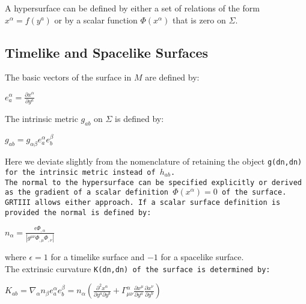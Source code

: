 \documentclass{article}
\begin{document}
A hypersurface can be defined by either a set of relations of the form $x^\alpha = f(y^a)$ or by a scalar function $\Phi(x^\alpha)$ that is zero on 
$\Sigma$. \\

\subsection{Timelike and Spacelike Surfaces}

The basic vectors of the surface in $M$ are defined by:
\begin{center}
$e^{\alpha}_{a} = \frac{\partial x^{\alpha}}{\partial y^a}$
\end{center}


The intrinsic metric $g_{a b}$ on $\Sigma$ is defined by:
\begin{center}
$g_{a b} = g_{\alpha \beta} e^{\alpha}_a e^{\beta}_b$
\end{center}
Here we deviate slightly from the nomenclature of \cite{poisson:2004} retaining the object \text\tt{g(dn,dn)} for the intrinsic metric instead of $h_{a b}$. \\

The normal to the hypersurface can be specified explicitly or derived as the gradient of a scalar definition $\Phi(x^\alpha) = 0$ of the surface. GRTIII 
allows either approach. If a scalar surface definition is provided the normal is defined by:
\begin{center}
$n_\alpha = \frac{\epsilon \Phi_{,\alpha}}{\left| g^{\mu \nu} \Phi_{,\mu} \Phi_{,\nu} \right|}$
\end{center}
where $\epsilon=1$ for a timelike surface and $-1$ for a spacelike surface. \\

The extrinsic curvature \text\tt{K(dn,dn)} of the surface is determined by:
\begin{center}
$K_{a b} = \nabla_\alpha n_\beta e^\alpha_a e^\beta_b = n_\alpha \left( \frac{\partial^2 x^\alpha}{\partial y^a \partial y^b}
+ \Gamma^\alpha_{\mu \nu} \frac{\partial x^{\mu}}{\partial y^a} \frac{\partial x^{\nu}}{\partial y^b} \right)$
\end{center}
\end{document}

